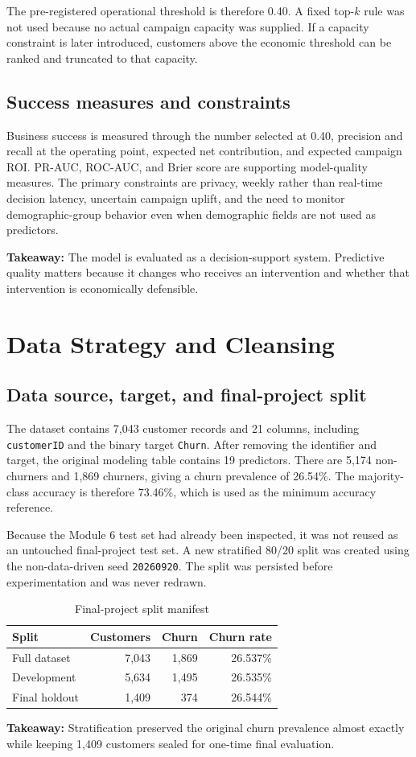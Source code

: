 \documentclass[11pt]{article}
\newcommand{\takeaway}[1]{\vspace{1pt}\noindent\textbf{Takeaway:} #1\vspace{3pt}}
\newcommand{\code}[1]{\texttt{#1}}
\begin{document}
The pre-registered operational threshold is therefore 0.40. A fixed top-$k$ rule was not used because no actual campaign capacity was supplied. If a capacity constraint is later introduced, customers above the economic threshold can be ranked and truncated to that capacity.

\subsection{Success measures and constraints}

Business success is measured through the number selected at 0.40, precision and recall at the operating point, expected net contribution, and expected campaign ROI. PR-AUC, ROC-AUC, and Brier score are supporting model-quality measures. The primary constraints are privacy, weekly rather than real-time decision latency, uncertain campaign uplift, and the need to monitor demographic-group behavior even when demographic fields are not used as predictors.

\takeaway{The model is evaluated as a decision-support system. Predictive quality matters because it changes who receives an intervention and whether that intervention is economically defensible.}

\section{Data Strategy and Cleansing}

\subsection{Data source, target, and final-project split}

The dataset contains 7,043 customer records and 21 columns, including \code{customerID} and the binary target \code{Churn}. After removing the identifier and target, the original modeling table contains 19 predictors. There are 5,174 non-churners and 1,869 churners, giving a churn prevalence of 26.54\%. The majority-class accuracy is therefore 73.46\%, which is used as the minimum accuracy reference.

Because the Module 6 test set had already been inspected, it was not reused as an untouched final-project test set. A new stratified 80/20 split was created using the non-data-driven seed \code{20260920}. The split was persisted before experimentation and was never redrawn.

\begin{table}[H]
\centering\small
\caption{Final-project split manifest}
\begin{tabular}{lrrr}
\toprule
Split & Customers & Churn & Churn rate \\
\midrule
Full dataset & 7,043 & 1,869 & 26.537\% \\
Development & 5,634 & 1,495 & 26.535\% \\
Final holdout & 1,409 & 374 & 26.544\% \\
\bottomrule
\end{tabular}
\end{table}
\takeaway{Stratification preserved the original churn prevalence almost exactly while keeping 1,409 customers sealed for one-time final evaluation.}
\end{document}
